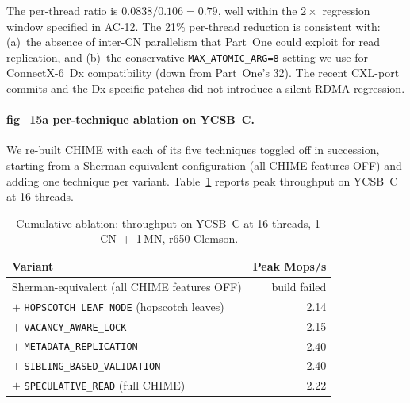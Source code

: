 \documentclass[11pt,a4paper]{article}
\begin{document}
The per-thread ratio is $0.0838 / 0.106 = 0.79$, well within the $2\times$ regression window specified in AC-12. The 21\% per-thread reduction is consistent with: (a)~the absence of inter-CN parallelism that Part~One could exploit for read replication, and (b)~the conservative \texttt{MAX\_ATOMIC\_ARG=8} setting we use for ConnectX-6~Dx compatibility (down from Part~One's 32). The recent CXL-port commits and the Dx-specific patches did not introduce a silent RDMA regression.

\paragraph{fig\_15a per-technique ablation on YCSB~C.} We re-built CHIME with each of its five techniques toggled off in succession, starting from a Sherman-equivalent configuration (all CHIME features OFF) and adding one technique per variant. Table~\ref{tab:fig15a-c} reports peak throughput on YCSB~C at 16 threads.

\begin{table}[H]
\centering
\small
\caption{Cumulative ablation: throughput on YCSB~C at 16 threads, 1\,CN~$+$~1\,MN, r650 Clemson.}
\label{tab:fig15a-c}
\begin{tabular}{@{}lr@{}}
\toprule
Variant & Peak Mops/s \\
\midrule
Sherman-equivalent (all CHIME features OFF) & build failed \\
$+$ \texttt{HOPSCOTCH\_LEAF\_NODE} (hopscotch leaves)        & 2.14 \\
$+$ \texttt{VACANCY\_AWARE\_LOCK}                            & 2.15 \\
$+$ \texttt{METADATA\_REPLICATION}                           & 2.40 \\
$+$ \texttt{SIBLING\_BASED\_VALIDATION}                      & 2.40 \\
$+$ \texttt{SPECULATIVE\_READ} (full CHIME)                  & 2.22 \\
\bottomrule
\end{tabular}
\end{table}
\end{document}
